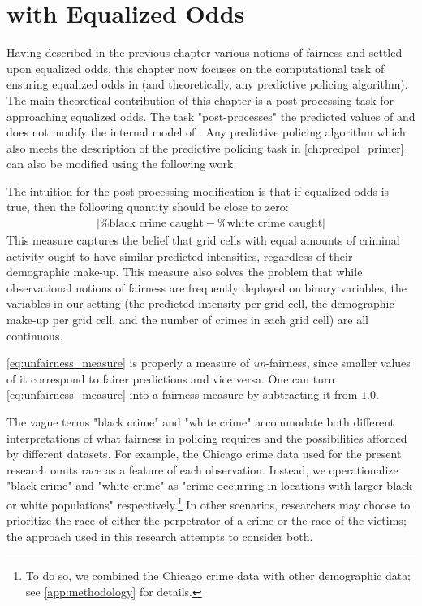 \chapter{\pp with Equalized Odds}\label{ch:fairpol}

Having described in the previous chapter various notions of fairness and settled upon equalized odds, this chapter now focuses on the computational task of ensuring equalized odds in \pp (and theoretically, any predictive policing algorithm). The main theoretical contribution of this chapter is a post-processing task for approaching equalized odds. The task "post-processes" the predicted values of \pp and does not modify the internal model of \pp. Any predictive policing algorithm which also meets the description of the predictive policing task in \autoref{ch:predpol_primer} can also be modified using the following work.

The intuition for the post-processing modification is that if equalized odds is true, then the following quantity should be close to zero:
\begin{align}
    \left|\text{\% black crime caught} - \text{\% white crime caught}\right| \label{eq:unfairness_measure}
\end{align}
This measure captures the belief that grid cells with equal amounts of criminal activity ought to have similar predicted intensities, regardless of their demographic make-up. This measure also solves the problem that while observational notions of fairness are frequently deployed on binary variables, the variables in our setting (the predicted intensity per grid cell, the demographic make-up per grid cell, and the number of crimes in each grid cell) are all continuous.

\autoref{eq:unfairness_measure} is properly a measure of \emph{un}-fairness, since smaller values of it correspond to fairer predictions and vice versa. One can turn \autoref{eq:unfairness_measure} into a fairness measure by subtracting it from $1.0$.

The vague terms "black crime" and "white crime" accommodate both different interpretations of what fairness in policing requires and the possibilities afforded by different datasets. For example, the Chicago crime data used for the present research omits race as a feature of each observation. Instead, we operationalize "black crime" and "white crime" as "crime occurring in locations with larger black or white populations" respectively.\footnote{To do so, we combined the Chicago crime data with other demographic data; see \autoref{app:methodology} for details.} In other scenarios, researchers may choose to prioritize the race of either the perpetrator of a crime or the race of the victims; the approach used in this research attempts to consider both.


